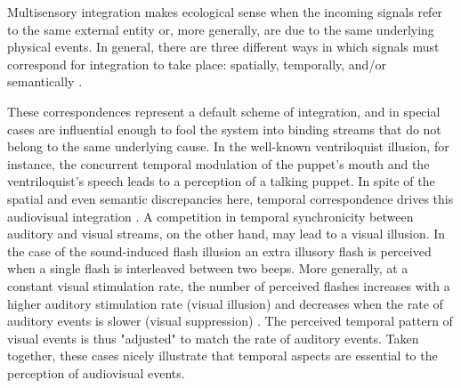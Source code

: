
Multisensory integration makes ecological sense when the incoming signals
refer to the same external entity or, more generally, are due to the same
underlying physical events. In general, there are three different ways in
which signals must correspond for integration to take place: spatially,
temporally, and/or semantically \citep{stein1993a, macaluso2005a,
calvert2001c, doehrmann2008a}.



These correspondences represent a default scheme of integration, and in
special cases are influential enough to fool the system into binding
streams that do not belong to the same underlying cause. In the well-known
ventriloquist illusion, for instance, the concurrent temporal modulation of
the puppet's mouth and the ventriloquist's speech leads to a perception of
a talking puppet. In spite of the spatial and even semantic discrepancies
here, temporal correspondence drives this audiovisual integration
\citep{vroomen2004a, bonath2007a}. A competition in temporal synchronicity
between auditory and visual streams, on the other hand, may lead to a
visual illusion. In the case of the sound-induced flash illusion
\citep{shams2000a, shams2002a, mishra2007a, mishra2008a} an extra illusory
flash is perceived when a single flash is interleaved between two beeps.
More generally, at a constant visual stimulation rate, the number of
perceived flashes increases with a higher auditory stimulation rate (visual
illusion) and decreases when the rate of auditory events is slower (visual
suppression) \citep[e.g.][]{shipley1964a, noesselt2008a}.  The perceived
temporal pattern of visual events is thus "adjusted" to match the rate of
auditory events. Taken together, these cases nicely illustrate that
temporal aspects are essential to the perception of audiovisual events.



